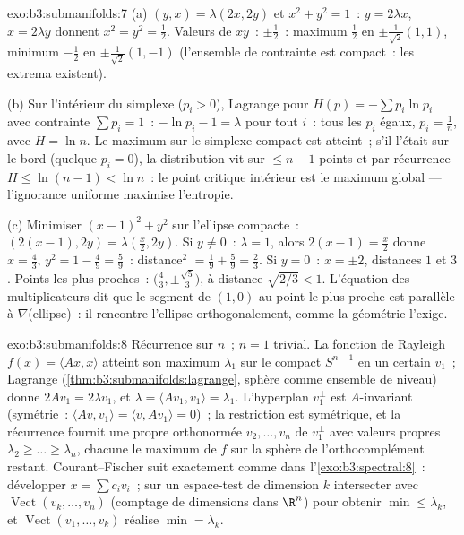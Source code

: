 \begin{solution}{exo:b3:submanifolds:7}
(a) $(y, x) = \lambda(2x, 2y)$ et $x^2 + y^2 = 1$~: $y =
2\lambda x$, $x = 2\lambda y$ donnent $x^2 = y^2 =
\frac12$. Valeurs de $xy$~: $\pm\frac12$~: maximum $\frac12$
en $\pm\frac1{\sqrt2}(1,1)$, minimum $-\frac12$ en
$\pm\frac1{\sqrt2}(1,-1)$ (l'ensemble de contrainte est
compact~: les extrema existent).

(b) Sur l'intérieur du simplexe ($p_i > 0$), Lagrange pour
$H(p) = -\sum p_i\ln p_i$ avec contrainte $\sum p_i = 1$~:
$-\ln p_i - 1 = \lambda$ pour tout $i$~: tous les $p_i$
égaux, $p_i = \frac1n$, avec $H = \ln n$. Le maximum sur le
simplexe compact est atteint~; s'il l'était sur le bord
(quelque $p_i = 0$), la distribution vit sur $\leq n - 1$
points et par récurrence $H \leq \ln(n-1) < \ln n$~: le
point critique intérieur est le maximum global ---
l'ignorance uniforme maximise l'entropie.

(c) Minimiser $(x-1)^2 + y^2$ sur l'ellipse compacte~:
$(2(x{-}1), 2y) = \lambda(\frac x2, 2y)$. Si $y \neq 0$~:
$\lambda = 1$, alors $2(x - 1) = \frac x2$ donne $x =
\frac43$, $y^2 = 1 - \frac49 = \frac59$~: distance$^2$ $=
\frac19 + \frac59 = \frac23$. Si $y = 0$~: $x = \pm2$,
distances $1$ et $3$. Points les plus proches~:
$\bigl(\frac43, \pm\frac{\sqrt5}3\bigr)$, à distance
$\sqrt{2/3} < 1$. L'équation des multiplicateurs dit que le
segment de $(1,0)$ au point le plus proche est parallèle à
$\nabla$(ellipse)~: il rencontre l'ellipse orthogonalement,
comme la géométrie l'exige.
\end{solution}

\begin{solution}{exo:b3:submanifolds:8}
Récurrence sur $n$~; $n = 1$ trivial. La fonction de Rayleigh
$f(x) = \langle Ax, x\rangle$ atteint son maximum $\lambda_1$
sur le compact $S^{n-1}$ en un certain $v_1$~; Lagrange
(\cref{thm:b3:submanifolds:lagrange}, sphère comme ensemble
de niveau) donne $2Av_1 = 2\lambda v_1$, et $\lambda =
\langle Av_1, v_1\rangle = \lambda_1$. L'hyperplan $v_1^\perp$
est $A$-invariant (symétrie~: $\langle Av, v_1\rangle =
\langle v, Av_1\rangle = 0$)~; la restriction est symétrique,
et la récurrence fournit une  propre orthonormée $v_2,
\dots, v_n$ de $v_1^\perp$ avec valeurs propres $\lambda_2
\geq \dots \geq \lambda_n$, chacune le maximum de $f$ sur la
sphère de l'orthocomplément restant. Courant--Fischer suit
exactement comme dans l'\cref{exo:b3:spectral:8}~: développer
$x = \sum c_iv_i$~; sur un espace-test de dimension $k$
intersecter avec $\operatorname{Vect}(v_k, \dots, v_n)$
(comptage de dimensions dans $\R^n$) pour obtenir $\min \leq
\lambda_k$, et $\operatorname{Vect}(v_1, \dots, v_k)$
réalise $\min = \lambda_k$.
\end{solution}

